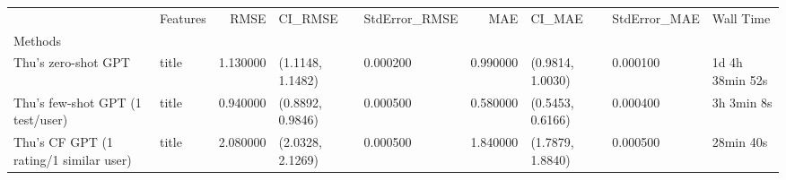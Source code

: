 \begin{tabular}{llrllrlll}
 & Features & RMSE & CI_RMSE & StdError_RMSE & MAE & CI_MAE & StdError_MAE & Wall Time \\
Methods &  &  &  &  &  &  &  &  \\
Thu's zero-shot GPT & title & 1.130000 & (1.1148, 1.1482) & 0.000200 & 0.990000 & (0.9814, 1.0030) & 0.000100 & 1d 4h 38min 52s \\
Thu's few-shot GPT (1 test/user) & title & 0.940000 & (0.8892, 0.9846) & 0.000500 & 0.580000 & (0.5453, 0.6166) & 0.000400 & 3h 3min 8s \\
Thu's CF GPT (1 rating/1 similar user) & title & 2.080000 & (2.0328, 2.1269) & 0.000500 & 1.840000 & (1.7879, 1.8840) & 0.000500 & 28min 40s \\
\end{tabular}
